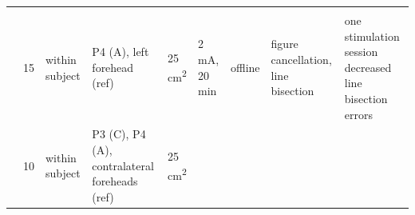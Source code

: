 \documentclass[11pt,]{memoir}
\begin{document}
\begin{longtable}[]{@{}lllllllll@{}}
\begin{minipage}[t]{0.28\columnwidth}
\end{minipage}\tabularnewline
\begin{minipage}[t]{0.09\columnwidth}\raggedright
\textcite{Ko2008}\strut
\end{minipage} & \begin{minipage}[t]{0.02\columnwidth}\raggedright
15\strut
\end{minipage} & \begin{minipage}[t]{0.04\columnwidth}\raggedright
within
subject\strut
\end{minipage} & \begin{minipage}[t]{0.10\columnwidth}\raggedright
P4 (A), left
forehead (ref)\strut
\end{minipage} & \begin{minipage}[t]{0.04\columnwidth}\raggedright
25
cm\textsuperscript{2}\strut
\end{minipage} & \begin{minipage}[t]{0.04\columnwidth}\raggedright
2 mA,
20 min\strut
\end{minipage} & \begin{minipage}[t]{0.04\columnwidth}\raggedright
offline\strut
\end{minipage} & \begin{minipage}[t]{0.10\columnwidth}\raggedright
figure cancellation,
line bisection\strut
\end{minipage} & \begin{minipage}[t]{0.28\columnwidth}\raggedright
one stimulation session decreased line bisection errors\strut
\end{minipage}\tabularnewline
\begin{minipage}[t]{0.09\columnwidth}\raggedright
\textcite{Sunwoo2013}\strut
\end{minipage} & \begin{minipage}[t]{0.02\columnwidth}\raggedright
10\strut
\end{minipage} & \begin{minipage}[t]{0.04\columnwidth}\raggedright
within
subject\strut
\end{minipage} & \begin{minipage}[t]{0.10\columnwidth}\raggedright
P3 (C), P4 (A),
contralateral
foreheads (ref)\strut
\end{minipage} & \begin{minipage}[t]{0.04\columnwidth}\raggedright
25
cm\textsuperscript{2}\strut
\end{minipage} & \begin{minipage}[t]{0.04\columnwidth}\raggedright

\end{minipage}
\end{longtable}
\end{document}
